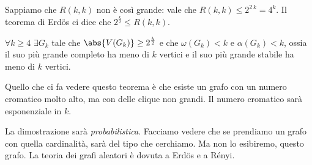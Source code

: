 	Sappiamo che $R(k,k)$ non \`e cos\`i grande: vale che $R(k,k) \le 2^{2 \, k} = 4^k$.
	Il teorema di Erd\"os ci dice che $2^{\frac{k}{2}} \le R(k,k)$.

	\begin{theorem}[di Erd\"os]
		$\forall k \ge 4$ $\exists G_k$ tale che $\abs{V(G_k)} \ge 2^{\frac{k}{2}}$ e che $\omega(G_k) < k$ e $\alpha(G_k) < k$, ossia il suo pi\`u grande completo ha meno di $k$ vertici e il suo pi\`u grande stabile ha meno di $k$ vertici.
	\end{theorem}
	Quello che ci fa vedere questo teorema \`e che esiste un grafo con un numero cromatico molto alto, ma con delle clique non grandi.
	Il numero cromatico sar\`a esponenziale in $k$.

	La dimostrazione sar\`a \emph{probabilistica}.
	Facciamo vedere che se prendiamo un grafo con quella cardinalit\`a, sar\`a del tipo che cerchiamo.
	Ma non lo esibiremo, questo grafo.
	La teoria dei grafi aleatori \`e dovuta a Erd\"os e a R\'enyi.

